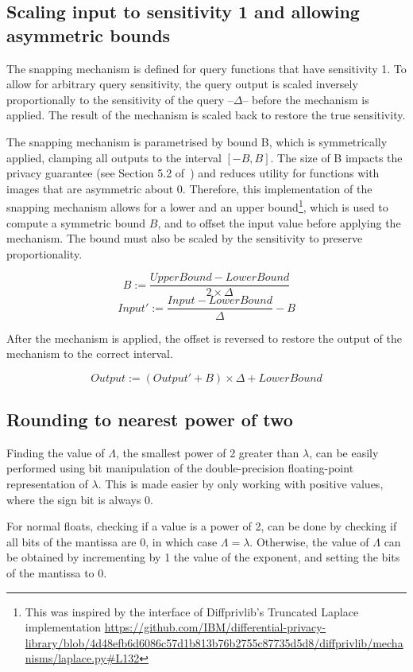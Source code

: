 \documentclass[orivec,envcountsame]{llncs}
\begin{document}
\subsection{Scaling input to sensitivity 1 and allowing asymmetric bounds}
The snapping mechanism is defined for query functions that have sensitivity 1. To allow for arbitrary query sensitivity, the query output is scaled inversely proportionally to the sensitivity of the query --$\Delta$-- before the mechanism is applied. The result of the mechanism is scaled back to restore the true sensitivity.

The snapping mechanism is parametrised by bound B, which is symmetrically applied, clamping all outputs to the interval $[-B, B]$. The size of B impacts the privacy guarantee (see Section 5.2 of~\cite{mironov2012significance}) and reduces utility for functions with images that are asymmetric about 0. Therefore, this implementation of the snapping mechanism allows for a lower and an upper bound\footnote{This was inspired by the interface of Diffprivlib's Truncated Laplace implementation \url{https://github.com/IBM/differential-privacy-library/blob/4d48efb6d6086c57d1b813b76b2755c87735d5d8/diffprivlib/mechanisms/laplace.py\#L132}}, which is used to compute a symmetric bound $B$, and to offset the input value before applying the mechanism. The bound must also be scaled by the sensitivity to preserve proportionality. 

$$B := \frac{UpperBound - LowerBound}{2\times\Delta} $$
$$Input' := \frac{Input - LowerBound}{\Delta} - B$$

After the mechanism is applied, the offset is reversed to restore the output of the mechanism to the correct interval.

$$Output := (Output' +B)\times\Delta + LowerBound$$

\subsection{Rounding to nearest power of two}
Finding the value of $\Lambda$, the smallest power of 2 greater than $\lambda$, can be easily performed using bit manipulation of the double-precision floating-point representation of $\lambda$. This is made easier by only working with positive values, where the sign bit is always 0.

For normal floats, checking if a value is a power of 2, can be done by checking if all bits of the mantissa are 0, in which case $\Lambda = \lambda$. Otherwise, the value of $\Lambda$ can be obtained by incrementing by 1 the value of the exponent, and setting the bits of the mantissa to 0. 
\end{document}
